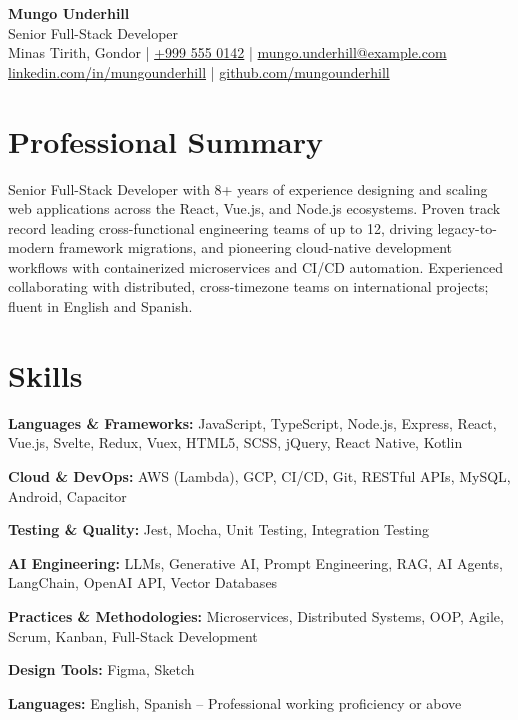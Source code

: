 \documentclass[letterpaper,11pt]{article}
\newcommand{\candidatename}{Mungo Underhill}
\newlength{\cventrysep}\setlength{\cventrysep}{6pt}  %
\newlength{\cvblocksep}\setlength{\cvblocksep}{4pt}  %
\newcommand{\cvsection}[1]{\section{#1}}
\newcommand{\skillrow}[2]{\noindent\textbf{#1:} #2\par\vspace{2pt}}
\begin{document}
\pagestyle{empty}

\begin{center}
    {\huge\textbf{\candidatename}} \\ \vspace{2pt}
    {\normalsize\color{accent}Senior Full-Stack Developer} \\ \vspace{4pt}
    \small
    Minas Tirith, Gondor \quad|\quad
    \href{tel:+9995550142}{+999 555 0142} \quad|\quad
    \href{mailto:mungo.underhill@example.com}{mungo.underhill@example.com} \\[3pt]
    \href{https://www.linkedin.com/in/mungounderhill/}{linkedin.com/in/mungounderhill} \quad|\quad
    \href{https://github.com/mungounderhill}{github.com/mungounderhill}
\end{center}

\vspace{\cvblocksep}

\cvsection{Professional Summary}
\small
Senior Full-Stack Developer with 8+ years of experience designing and scaling web applications across the React, Vue.js, and Node.js ecosystems. Proven track record leading cross-functional engineering teams of up to 12, driving legacy-to-modern framework migrations, and pioneering cloud-native development workflows with containerized microservices and CI/CD automation. Experienced collaborating with distributed, cross-timezone teams on international projects; fluent in English and Spanish.

\vspace{\cventrysep}

\cvsection{Skills}
\small
\skillrow{Languages \& Frameworks}{JavaScript, TypeScript, Node.js, Express, React, Vue.js, Svelte, Redux, Vuex, HTML5, SCSS, jQuery, React Native, Kotlin}
\skillrow{Cloud \& DevOps}{AWS (Lambda), GCP, CI/CD, Git, RESTful APIs, MySQL, Android, Capacitor}
\skillrow{Testing \& Quality}{Jest, Mocha, Unit Testing, Integration Testing}
\skillrow{AI Engineering}{LLMs, Generative AI, Prompt Engineering, RAG, AI Agents, LangChain, OpenAI API, Vector Databases}
\skillrow{Practices \& Methodologies}{Microservices, Distributed Systems, OOP, Agile, Scrum, Kanban, Full-Stack Development}
\skillrow{Design Tools}{Figma, Sketch}
\skillrow{Languages}{English, Spanish -- Professional working proficiency or above}
\end{document}

